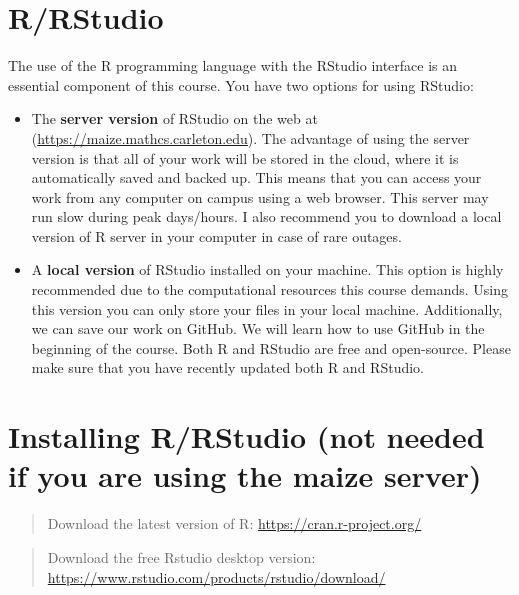 \documentclass[
]{book}
\begin{document}
\hypertarget{rrstudio}{%
\section{R/RStudio}\label{rrstudio}}

The use of the R programming language with the RStudio interface is an
essential component of this course. You have two options for using
RStudio:

\begin{itemize}
\item
  The \textbf{server version} of RStudio on the web at
  (\url{https://maize.mathcs.carleton.edu}). The advantage of using the
  server version is that all of your work will be stored in the cloud,
  where it is automatically saved and backed up. This means that you
  can access your work from any computer on campus using a web
  browser. This server may run slow during peak days/hours. I also recommend
  you to download a local version of R server in your computer in case of rare outages.
\item
  A \textbf{local version} of RStudio installed on your machine. This
  option is highly recommended due to the computational resources this
  course demands. Using this version you can only store your files in your local machine. Additionally, we can save our work on GitHub. We will learn how to use GitHub in the beginning of the course. Both R and RStudio are free and open-source. Please make sure that you have recently updated both R and RStudio.
\end{itemize}

\hypertarget{installing-rrstudio-not-needed-if-you-are-using-the-maize-server}{%
\section{\texorpdfstring{\textbf{Installing R/RStudio (not needed if you are using the maize server)}}{Installing R/RStudio (not needed if you are using the maize server)}}\label{installing-rrstudio-not-needed-if-you-are-using-the-maize-server}}

\begin{quote}
Download the latest version of R: \url{https://cran.r-project.org/}
\end{quote}

\begin{quote}
Download the free Rstudio desktop version: \url{https://www.rstudio.com/products/rstudio/download/}
\end{quote}
\end{document}
